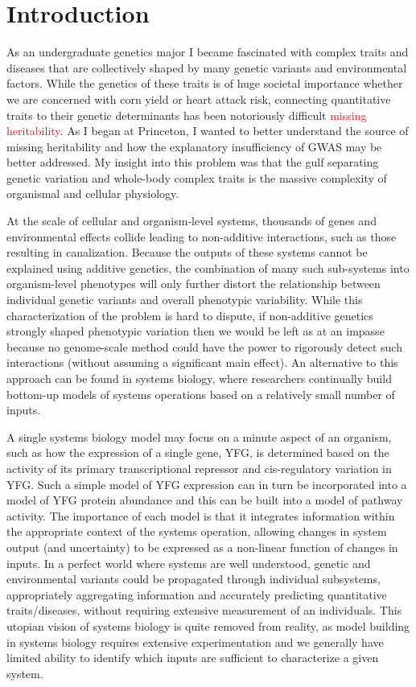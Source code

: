 
\chapter{Introduction\label{ch:intro}}

As an undergraduate genetics major I became fascinated with complex traits and diseases that are collectively shaped by many genetic variants and environmental factors.  While the genetics of these traits is of huge societal importance whether we are concerned with corn yield or heart attack risk, connecting quantitative traits to their genetic determinants has been notoriously difficult \textcolor{red}{missing heritability}.  As I began at Princeton, I wanted to better understand the source of missing heritability and how the explanatory insufficiency of GWAS may be better addressed. My insight into this problem was that the gulf separating genetic variation and whole-body complex traits is the massive complexity of organismal and cellular physiology.

At the scale of cellular and organism-level systems, thousands of genes and environmental effects collide leading to non-additive interactions, such as those resulting in canalization. Because the outputs of these systems cannot be explained using additive genetics, the combination of many such sub-systems into organism-level phenotypes will only further distort the relationship between individual genetic variants and overall phenotypic variability. While this characterization of the problem is hard to dispute, if non-additive genetics strongly shaped phenotypic variation then we would be left as at an impasse because no genome-scale method could have the power to rigorously detect such interactions (without assuming a significant main effect). An alternative to this approach can be found in systems biology, where researchers continually build bottom-up models of systems operations based on a relatively small number of inputs.

A single systems biology model may focus on a minute aspect of an organism, such as how the expression of a single gene, YFG, is determined based on the activity of its primary transcriptional repressor and cis-regulatory variation in YFG. Such a simple model of YFG expression can in turn be incorporated into a model of YFG protein abundance and this can be built into a model of pathway activity.  The importance of each model is that it integrates information within the appropriate context of the systems operation, allowing changes in system output (and uncertainty) to be expressed as a non-linear function of changes in inputs. In a perfect world where systems are well understood, genetic and environmental variants could be propagated through individual subsystems, appropriately aggregating information and accurately predicting quantitative traits/diseases, without requiring extensive measurement of an individuals. This utopian vision of systems biology is quite removed from reality, as model building in systems biology requires extensive experimentation and we generally have limited ability to identify which inputs are sufficient to characterize a given system.

